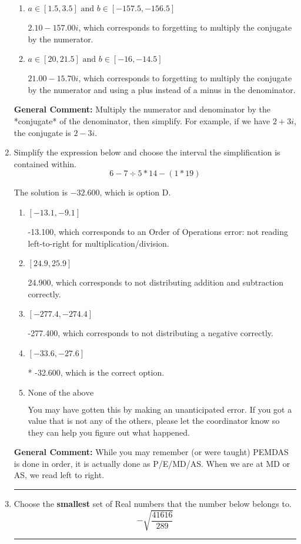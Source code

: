 \documentclass{extbook}[14pt]
\newcommand{\litem}[1]{\item #1

\rule{\textwidth}{0.4pt}}
\begin{document}
\begin{enumerate}
{\begin{enumerate}[label=\Alph*.]
 $-45.00  + 7.33 i$, which corresponds to just dividing the first term by the first term and the second by the second.
\item \( a \in [1.5, 3.5] \text{ and } b \in [-157.5, -156.5] \)

 $2.10  - 157.00 i$, which corresponds to forgetting to multiply the conjugate by the numerator.
\item \( a \in [20, 21.5] \text{ and } b \in [-16, -14.5] \)

 $21.00  - 15.70 i$, which corresponds to forgetting to multiply the conjugate by the numerator and using a plus instead of a minus in the denominator.
\end{enumerate}

\textbf{General Comment:} Multiply the numerator and denominator by the *conjugate* of the denominator, then simplify. For example, if we have $2+3i$, the conjugate is $2-3i$.
}
\litem{
Simplify the expression below and choose the interval the simplification is contained within.
\[ 6 - 7 \div 5 * 14 - (1 * 19) \]

The solution is \( -32.600 \), which is option D.\begin{enumerate}[label=\Alph*.]
\item \( [-13.1, -9.1] \)

 -13.100, which corresponds to an Order of Operations error: not reading left-to-right for multiplication/division.
\item \( [24.9, 25.9] \)

 24.900, which corresponds to not distributing addition and subtraction correctly.
\item \( [-277.4, -274.4] \)

 -277.400, which corresponds to not distributing a negative correctly.
\item \( [-33.6, -27.6] \)

* -32.600, which is the correct option.
\item \( \text{None of the above} \)

 You may have gotten this by making an unanticipated error. If you got a value that is not any of the others, please let the coordinator know so they can help you figure out what happened.
\end{enumerate}

\textbf{General Comment:} While you may remember (or were taught) PEMDAS is done in order, it is actually done as P/E/MD/AS. When we are at MD or AS, we read left to right.
}
\litem{
Choose the \textbf{smallest} set of Real numbers that the number below belongs to.
\[ -\sqrt{\frac{41616}{289}} \]

}
\end{enumerate}
\end{document}
